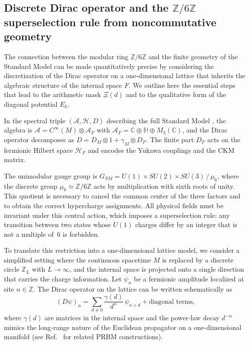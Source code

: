 \documentclass[aps,prl,preprint,superscriptaddress,floatfix]{revtex4-2}
\newcommand{\Zmod}{\mathbb{Z}/6\mathbb{Z}}
\begin{document}
\subsection{Discrete Dirac operator and the \texorpdfstring{$\mathbb{Z}/6\mathbb{Z}$}{Z/6Z} superselection rule from noncommutative geometry}
\label{sec:ncg_discrete}

The connection between the modular ring $\Zmod$ and the finite geometry of the Standard Model can be made quantitatively precise by considering the discretization of the Dirac operator on a one‑dimensional lattice that inherits the algebraic structure of the internal space $F$. We outline here the essential steps that lead to the arithmetic mask $\Xi(d)$ and to the qualitative form of the diagonal potential $E_k$.

In the spectral triple $(\mathcal{A}, \mathcal{H}, D)$ describing the full Standard Model \cite{Connes2008,Chamseddine2007}, the algebra is $\mathcal{A}=C^\infty(M)\otimes \mathcal{A}_F$ with $\mathcal{A}_F=\mathbb{C}\oplus\mathbb{H}\oplus M_3(\mathbb{C})$, and the Dirac operator decomposes as $D = D_M\otimes 1 + \gamma_M\otimes D_F$. The finite part $D_F$ acts on the fermionic Hilbert space $\mathcal{H}_F$ and encodes the Yukawa couplings and the CKM matrix.

The unimodular gauge group is $G_{SM}=U(1)\times SU(2)\times SU(3)\,/\,\mu_6$, where the discrete group $\mu_6\simeq\Zmod$ acts by multiplication with sixth roots of unity. This quotient is necessary to cancel the common center of the three factors and to obtain the correct hypercharge assignments. All physical fields must be invariant under this central action, which imposes a superselection rule: any transition between two states whose $U(1)$ charges differ by an integer that is not a multiple of~6 is forbidden.

To translate this restriction into a one‑dimensional lattice model, we consider a simplified setting where the continuous spacetime $M$ is replaced by a discrete circle $\mathbb{Z}_L$ with $L\to\infty$, and the internal space is projected onto a single direction that carries the charge information. Let $\psi_n$ be a fermionic amplitude localized at site $n\in\mathbb{Z}$. The Dirac operator on the lattice can be written schematically as
\begin{equation}
(D\psi)_n = \sum_{d\neq 0} \frac{\gamma(d)}{d^{\alpha}} \, \psi_{n+d} + \text{diagonal terms},
\end{equation}
where $\gamma(d)$ are matrices in the internal space and the power‑law decay $d^{-\alpha}$ mimics the long‑range nature of the Euclidean propagator on a one‑dimensional manifold (see Ref.~\cite{Mirlin1996} for related PRBM constructions).
\end{document}
